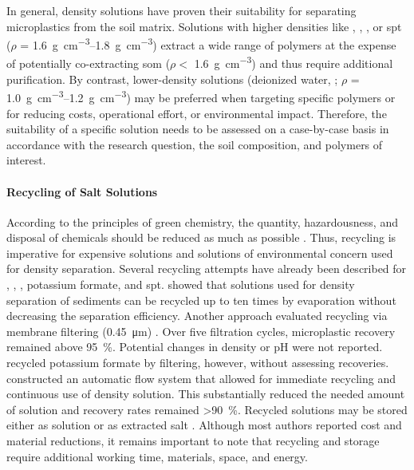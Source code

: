 In general, density solutions have proven their suitability for separating microplastics from the soil matrix. Solutions with higher densities like , , , or \ac{spt} ($\rho$ = \SIrange{1.6}{1.8}{\gram\per\cubic\centi\meter}) extract a wide range of polymers at the expense of potentially co-extracting \ac{som} ($\rho <$ \SI{1.6}{\gram\per\cubic\centi\meter}) \citep{CerliSeparation2012} and thus require additional purification. By contrast, lower-density solutions (deionized water, ; $\rho$ = \SIrange{1.0}{1.2}{\gram\per\cubic\centi\meter}) may be preferred when targeting specific polymers or for reducing costs, operational effort, or environmental impact. Therefore, the suitability of a specific solution needs to be assessed on a case-by-case basis in accordance with the research question, the soil composition, and polymers of interest.

\paragraph{Recycling of Salt Solutions}

According to the principles of green chemistry, the quantity, hazardousness, and disposal of chemicals should be reduced as much as possible \citep{AnastasGreen2009}.
Thus, recycling is imperative for expensive solutions and solutions of environmental concern used for density separation. Several recycling attempts have already been described for , , , potassium formate, and \ac{spt}.  showed that  solutions used for density separation of sediments can be recycled up to ten times by evaporation without decreasing the separation efficiency. Another approach evaluated  recycling via membrane filtering (\SI{0.45}{\micro\meter}) \citep{RodriguesImproving2020}. Over five filtration cycles, microplastic recovery remained above \SI{95}{\percent}. Potential changes in density or pH were not reported.  recycled potassium formate by filtering, however, without assessing recoveries.  constructed an automatic flow system that allowed for immediate recycling and continuous use of density solution.
This substantially reduced the needed amount of  solution and recovery rates remained \SI{>90}{\percent}. Recycled solutions may be stored either as solution \citep{LiuMethod2019,RodriguesImproving2020} or as extracted salt \citep{KedzierskiEfficient2017}. Although most authors reported cost and material reductions, it remains important to note that recycling and storage require additional working time, materials, space, and energy.

